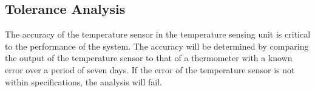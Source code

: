 \subsection{Tolerance Analysis}
The accuracy of the temperature sensor in the temperature sensing unit is critical to the performance of the system.  The accuracy will be determined by comparing the output of the temperature sensor to that of a thermometer with a known error over a period of seven days.  If the error of the temperature sensor is not within specifications, the analysis will fail.
